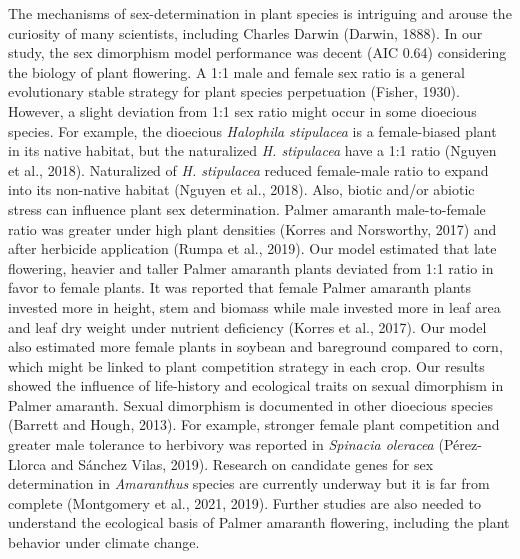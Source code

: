\documentclass[utf8]{frontiersSCNS}
\begin{document}
The mechanisms of sex-determination in plant species is intriguing and
arouse the curiosity of many scientists, including Charles Darwin
(Darwin, 1888). In our study, the sex dimorphism model performance was
decent (AIC 0.64) considering the biology of plant flowering. A 1:1 male
and female sex ratio is a general evolutionary stable strategy for plant
species perpetuation (Fisher, 1930). However, a slight deviation from
1:1 sex ratio might occur in some dioecious species. For example, the
dioecious \emph{Halophila stipulacea} is a female-biased plant in its
native habitat, but the naturalized \emph{H. stipulacea} have a 1:1
ratio (Nguyen et al., 2018). Naturalized of \emph{H. stipulacea} reduced
female-male ratio to expand into its non-native habitat (Nguyen et al.,
2018). Also, biotic and/or abiotic stress can influence plant sex
determination. Palmer amaranth male-to-female ratio was greater under
high plant densities (Korres and Norsworthy, 2017) and after herbicide
application (Rumpa et al., 2019). Our model estimated that late
flowering, heavier and taller Palmer amaranth plants deviated from 1:1
ratio in favor to female plants. It was reported that female Palmer
amaranth plants invested more in height, stem and biomass while male
invested more in leaf area and leaf dry weight under nutrient deficiency
(Korres et al., 2017). Our model also estimated more female plants in
soybean and bareground compared to corn, which might be linked to plant
competition strategy in each crop. Our results showed the influence of
life-history and ecological traits on sexual dimorphism in Palmer
amaranth. Sexual dimorphism is documented in other dioecious species
(Barrett and Hough, 2013). For example, stronger female plant
competition and greater male tolerance to herbivory was reported in
\emph{Spinacia oleracea} (Pérez-Llorca and Sánchez Vilas, 2019).
Research on candidate genes for sex determination in \emph{Amaranthus}
species are currently underway but it is far from complete (Montgomery
et al., 2021, 2019). Further studies are also needed to understand the
ecological basis of Palmer amaranth flowering, including the plant
behavior under climate change.
\end{document}
